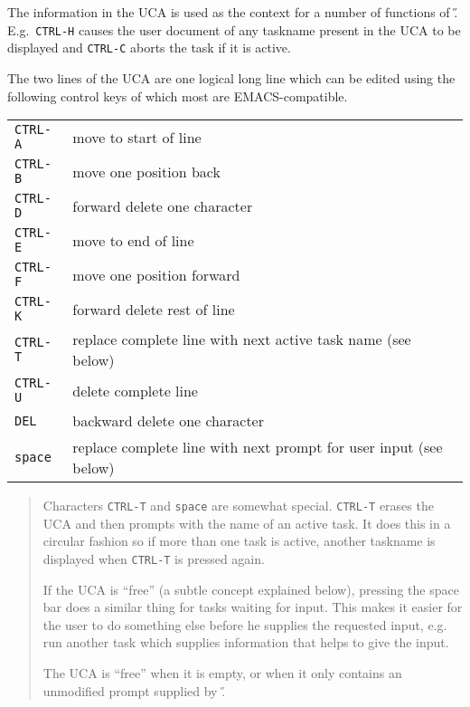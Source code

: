 The information in the UCA is used as the context for a number of functions of
\H.
E.g.\ {\tt CTRL-H} causes the user document of any taskname present in the
UCA to be displayed and {\tt CTRL-C} aborts the task if it is active.

The two lines of the UCA are one logical long line which can be edited using
the following control keys of which most are EMACS-compatible.

\begin{tabular}{ll}
{\tt CTRL-A}&move to start of line\\
{\tt CTRL-B}&move one position back\\
{\tt CTRL-D}&forward delete one character\\
{\tt CTRL-E}&move to end of line\\
{\tt CTRL-F}&move one position forward\\
{\tt CTRL-K}&forward delete rest of line\\
{\tt CTRL-T}&replace complete line with next active task name (see below)\\
{\tt CTRL-U}&delete complete line\\
{\tt DEL}&backward delete one character\\
{\tt space}&replace complete line with next prompt for user input (see below)\\
\end{tabular}

\begin{quote}
\small
\parskip=0mm
Characters {\tt CTRL-T} and {\tt space} are somewhat special.
{\tt CTRL-T} erases the UCA and then prompts with the name of an active task.
It does this in a circular fashion so if more than one task is active,
another taskname is displayed when {\tt CTRL-T} is pressed again.

If the UCA is ``free'' (a subtle concept explained below), pressing the space
bar does a similar thing for tasks waiting for input. This makes it easier for
the user to do something else before he supplies the requested input, e.g.
run another task which supplies information that helps to give the input.

The UCA is ``free'' when it is empty, or when it only contains an unmodified
prompt supplied by \H.
\end{quote}

